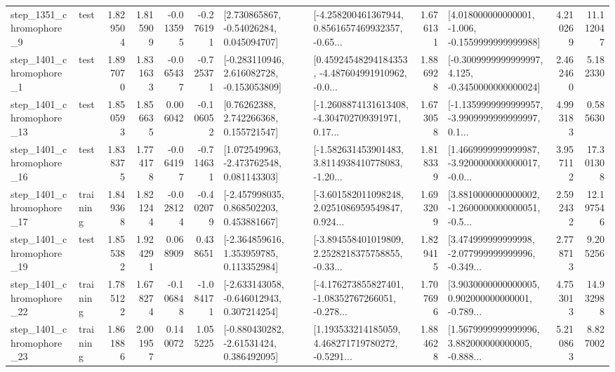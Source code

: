 \begin{tabular}{llrrrrllrlrr}
  step\_1351\_chromophore\_9 &      test &      1.829504 &    1.815909 &     -0.013595 & -0.276191 &     [2.730865867, -0.54026284, 0.045094707] &  [-4.258200461367944, 0.8561657469932357, -0.65... &       1.676131 &   [4.018000000000001, -1.006, -0.1559999999999988] &            4.210269 &         11.112047 \\
  step\_1401\_chromophore\_1 &      test &      1.897070 &    1.831633 &     -0.065437 & -0.725371 &   [-0.283110946, 2.616082728, -0.153053809] &  [0.45924548294184353, -4.487604991910962, -0.0... &       1.886928 &  [-0.3009999999999997, 4.125, -0.3450000000000024] &            2.462460 &          5.182330 \\
 step\_1401\_chromophore\_13 &      test &      1.850593 &    1.856635 &      0.006042 & -0.106052 &      [0.76262388, 2.742266368, 0.155721547] &  [-1.2608874131613408, -4.304702709391971, 0.17... &       1.673058 &  [-1.1359999999999957, -3.9909999999999997, 0.1... &            4.993183 &          0.585630 \\
 step\_1401\_chromophore\_16 &      test &      1.838375 &    1.774178 &     -0.064197 & -0.714631 &    [1.072549963, -2.473762548, 0.081143303] &  [-1.582631453901483, 3.8114938410778083, -1.20... &       1.818339 &  [1.4669999999999987, -3.9200000000000017, -0.0... &            3.957112 &         17.301308 \\
 step\_1401\_chromophore\_17 &  training &      1.849368 &    1.821244 &     -0.028124 & -0.402079 &    [-2.457998035, 0.868502203, 0.453881667] &  [-3.601582011098248, 2.0251086959549847, 0.924... &       1.693209 &  [3.8810000000000002, -1.2600000000000051, -0.5... &            2.592432 &         12.197546 \\
 step\_1401\_chromophore\_19 &      test &      1.855382 &    1.924291 &      0.068909 &  0.438651 &    [-2.364859616, 1.353959785, 0.113352984] &  [-3.894558401019809, 2.2528218375758855, -0.33... &       1.829415 &  [3.474999999999998, -2.077999999999996, -0.349... &            2.778713 &          9.205256 \\
 step\_1401\_chromophore\_22 &  training &      1.785122 &    1.678274 &     -0.106848 & -1.084171 &   [-2.633143058, -0.646012943, 0.307214254] &  [-4.176273855827401, -1.08352767266051, -0.278... &       1.707696 &  [3.9030000000000005, 0.902000000000001, -0.789... &            4.753013 &         14.932988 \\
 step\_1401\_chromophore\_23 &  training &      1.861886 &    2.001957 &      0.140072 &  1.055225 &    [-0.880430282, -2.61531424, 0.386492095] &  [1.193533214185059, 4.468271719780272, -0.5291... &       1.884628 &  [1.5679999999999996, 3.882000000000005, -0.888... &            5.210863 &          8.827002 \\

\end{tabular}
